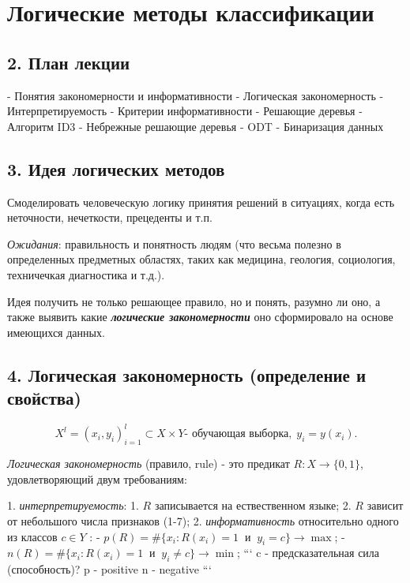 \section{Логические методы классификации}

\subsection{2. План лекции}

- Понятия закономерности и информативности
    - Логическая закономерность
    - Интерпретируемость
    - Критерии информативности
- Решающие деревья
    - Алгоритм ID3
    - Небрежные решающие деревья - ODT
    - Бинаризация данных

\subsection{3. Идея логических методов}

Смоделировать человеческую логику принятия решений в ситуациях, когда есть
неточности, нечеткости, прецеденты и т.п.

\textit{Ожидания}: правильность и понятность людям (что весьма полезно в
определенных предметных областях, таких как медицина, геология,
социология, техничечкая диагностика и т.д.).

Идея получить не только решающее правило, но и понять, разумно ли оно, а
также выявить какие \textbf{\textit{логические закономерности}} оно сформировало на
основе имеющихся данных.

\subsection{4. Логическая закономерность (определение и свойства)}

$$X^l = {\left( x_i, y_i \right)}^l_{i=1} \subset X \times Y \text{- обучающая выборка}, \; y_i = y{(x_i)}.$$

\textit{Логическая закономерность} (правило, rule) - это предикат
$R \! : X \rightarrow {\lbrace 0, 1\rbrace}$, удовлетворяющий двум требованиям:

1. \textit{интерпретируемость}:
    1. $R$ записывается на ествественном языке;
    2. $R$ зависит от небольшого числа признаков (1-7);
2. \textit{информативность} относительно одного из классов $c \in Y$ :
    - $p(R) = \# {\lbrace x_i \! : R(x_i)=1 \;\; \text{и} \;\; y_i=c \rbrace} \rightarrow \max$;
    - $n(R) = \# {\lbrace x_i \! : R(x_i)=1 \;\; \text{и} \;\; y_i \neq c \rbrace} \rightarrow \min$;
```
c - предсказательная сила (способность)?
p - positive
n - negative
```

